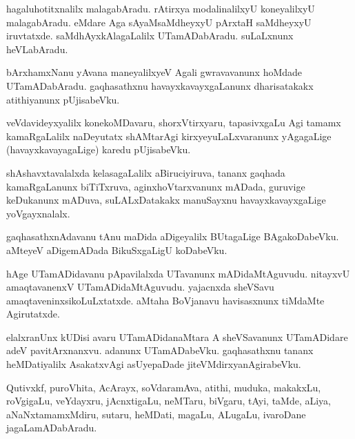 \documentclass{article}
\begin{document}
\begin{mn}
hagaluhotitxnalilx malagabAradu. rAtirxya modalinalilxyU koneyalilxyU
malagabAradu. eMdare Aga sAyaMsaMdheyxyU pArxtaH saMdheyxyU
iruvtatxde. saMdhAyxkAlagaLalilx UTamADabAradu. suLaLxnunx heVLabAradu.
\end{mn}

\begin{mn}
bArxhamxNanu yAvana maneyalilxyeV Agali gwravavanunx hoMdade
UTamADabAradu. gaqhasathxnu havayxkavayxgaLanunx dharisatakakx
atithiyanunx pUjisabeVku.
\end{mn}

\begin{mn}%
veVdavideyxyalilx konekoMDavaru, shorxVtirxyaru, tapasivxgaLu Agi
tamamx kamaRgaLalilx naDeyutatx shAMtarAgi kirxyeyuLaLxvaranunx
yAgagaLige (havayxkavayagaLige) karedu pUjisabeVku.
\end{mn}

\begin{mn}
shAshavxtavalalxda kelasagaLalilx aBiruciyiruva, tananx gaqhada
kamaRgaLanunx biTiTxruva, aginxhoVtarxvanunx mADada, guruvige
keDukanunx mADuva, suLALxDatakakx manuSayxnu havayxkavayxgaLige yoVgayxnalalx.
\end{mn}

\begin{mn}
gaqhasathxnAdavanu tAnu maDida aDigeyalilx BUtagaLige
BAgakoDabeVku. aMteyeV aDigemADada BikuSxgaLigU koDabeVku.
\end{mn}

\begin{mn}
hAge UTamADidavanu pApavilalxda UTavanunx mADidaMtAguvudu. nitayxvU
amaqtavanenxV UTamADidaMtAguvudu. yajacnxda sheVSavu
amaqtaveninxsikoLuLxtatxde. aMtaha BoVjanavu havisasxnunx tiMdaMte Agirutatxde.
\end{mn}

\begin{mn}
elalxranUnx kUDisi avaru UTamADidanaMtara A sheVSavanunx UTamADidare
adeV pavitArxnanxvu. adanunx UTamADabeVku. gaqhasathxnu tananx
heMDatiyalilx AsakatxvAgi asUyepaDade jiteVMdirxyanAgirabeVku.
\end{mn}

\begin{mn}%
Qutivxkf, puroVhita, AcArayx, soVdaramAva, atithi, muduka, makakxLu,
roVgigaLu, veYdayxru, jAcnxtigaLu, neMTaru, biVgaru, tAyi, taMde,
aLiya, aNaNxtamamxMdiru, sutaru, heMDati, magaLu, ALugaLu, ivaroDane jagaLamADabAradu.
\end{mn}
\end{document}
